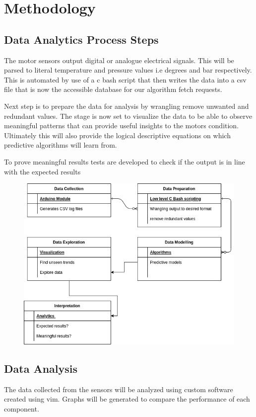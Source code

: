 
\section{Methodology}

\subsection{Data Analytics Process Steps}
 
The motor sensors output digital or analogue electrical signals. This will be parsed to literal temperature and pressure values i.e degrees and bar respectively. 
This is automated by use of a c bash script that then writes the data into a csv file that is now the accessible database for our algorithm fetch requests. 

Next step is to prepare the data for analysis by wrangling remove unwanted and redundant values. The stage is now set to visualize the data to be able to observe meaningful patterns that can provide useful insights to the motors condition. Ultimately this will also provide the logical descriptive equations on which predictive algorithms will learn from.

To prove meaningful results tests are developed to check if the output is in line with the expected results


\begin{figure}[hb]
	\centering
	\includegraphics[width=0.7\linewidth]{Figures/data_analytics_process-steps}
	
	\label{fig:dataanalyticsprocess-steps}
\end{figure}


\subsection{ Data Analysis}
The data collected from the sensors will be analyzed using custom software created using vim. Graphs will be generated to compare the performance of each component.

